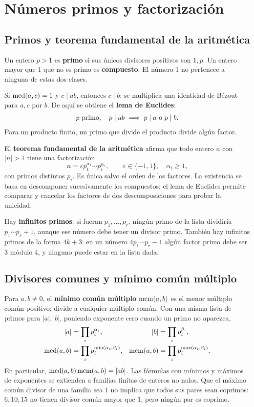 \chapter{Números primos y factorización}
\label{md:primos}

\section{Primos y teorema fundamental de la aritmética}

Un entero $p>1$ es \textbf{primo} si sus únicos divisores positivos
son $1,p$. Un entero mayor que $1$ que no es primo es \textbf{compuesto}.
El número $1$ no pertenece a ninguna de estas dos clases.

Si $\operatorname{mcd}(a,c)=1$ y $c\mid ab$, entonces $c\mid b$:
se multiplica una identidad de Bézout para $a,c$ por $b$.
De aquí se obtiene el \textbf{lema de Euclides}:
\[
 p\text{ primo},\quad p\mid ab\ \Longrightarrow\ p\mid a\text{ o }p\mid b.
\]
Para un producto finito, un primo que divide el producto divide algún factor.

El \textbf{teorema fundamental de la aritmética} afirma que todo
entero $n$ con $|n|>1$ tiene una factorización
\[
 n=\varepsilon p_1^{\alpha_1}\cdots p_r^{\alpha_r},\qquad
 \varepsilon\in\{-1,1\},\quad \alpha_i\ge1,
\]
con primos distintos $p_i$. Es única salvo el orden de los factores.
La existencia se basa en descomponer sucesivamente los compuestos;
el lema de Euclides permite comparar y cancelar los factores de dos
descomposiciones para probar la unicidad.

Hay \textbf{infinitos primos}: si fueran $p_1,\ldots,p_r$, ningún
primo de la lista dividiría $p_1\cdots p_r+1$, aunque ese número
debe tener un divisor primo. También hay infinitos primos de la forma
$4k+3$: en un número $4p_1\cdots p_r-1$ algún factor primo debe ser
$3$ módulo $4$, y ninguno puede estar en la lista dada.

\section{Divisores comunes y mínimo común múltiplo}
\label{md:mcm}

Para $a,b\ne0$, el \textbf{mínimo común múltiplo} $\operatorname{mcm}(a,b)$ es el
menor múltiplo común positivo; divide a cualquier múltiplo común.
Con una misma lista de primos para $|a|,|b|$, poniendo exponente cero
cuando un primo no aparezca,
\[
 \begin{aligned}
 |a|&=\prod_i p_i^{\alpha_i},& |b|&=\prod_i p_i^{\beta_i},\\
 \operatorname{mcd}(a,b)&=\prod_i p_i^{\min(\alpha_i,\beta_i)},&
 \operatorname{mcm}(a,b)&=\prod_i p_i^{\max(\alpha_i,\beta_i)}.
 \end{aligned}
\]
En particular, $\operatorname{mcd}(a,b)\operatorname{mcm}(a,b)=|ab|$.
Las fórmulas con mínimos y máximos de exponentes se extienden
a familias finitas de enteros no nulos.
Que el máximo común divisor de una familia sea $1$ no implica
que todos sus pares sean coprimos: $6,10,15$ no tienen divisor común
mayor que $1$, pero ningún par es coprimo.

